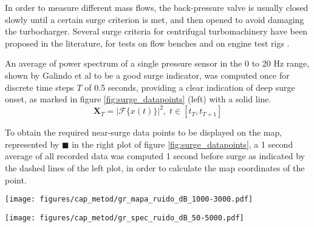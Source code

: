 In order to measure different mass flows, the back-pressure valve is usually closed slowly until a certain surge criterion is met, and then opened to avoid damaging the turbocharger. Several surge criteria for centrifugal turbomachinery have been proposed in the literature, for tests on flow benches \cite{galindo2006surge} and on engine test rigs \cite{galindo2013engine}.

An average of power spectrum of a single pressure sensor in the 0 to 20 Hz range, shown by Galindo et al \cite{galindo2006surge} to be a good surge indicator, was computed once for discrete time steps $T$ of 0.5 seconds, providing a clear indication of deep surge onset, as marked in figure \ref{fig:surge_datapoints} (left) with a solid line.
\begin{equation}
 \mathbf X_T=\left|\mathcal F\{x(t)\}\right|^2,\; t\in[t_T,t_{T+1}]
\end{equation}

To obtain the required near-surge data points to be displayed on the map, represented by $\blacksquare$ in the right plot of figure \ref{fig:surge_datapoints}, a 1 second average of all recorded data was computed 1 second before surge as indicated by the dashed lines of the left plot, in order to calculate the map coordinates of the point.

\begin{figure*}[t!]
\centering
\texttt{[image: figures/cap\_metod/gr\_mapa\_ruido\_dB\_1000-3000.pdf]}
\caption{Sample of noise level in the 1 -- 3 kHz band obtained through the processing described in subsection \ref{sub:noise_maps_and_spectrograms}, including the measured data points $(\circ)$ and the paths later expanded as spectrograms shown in figure \ref{fig:spec50-5k}. The left hand side map represents the inlet duct, whereas the right hand side map represents the outlet duct. }
\label{fig:map1k-3k}
\end{figure*}

\begin{figure*}[t!]
\centering
\texttt{[image: figures/cap\_metod/gr\_spec\_ruido\_dB\_50-5000.pdf]}
\caption{Sample of spectrograms calculated using the procedure outlined in subsection \ref{sub:noise_maps_and_spectrograms}, following the 160 krpm paths marked in figure \ref{fig:map1k-3k}. The 1--3 kHz band selected for the maps in figure \ref{fig:map1k-3k} is highlighted, along with some particular flow phenomena discussed in section \ref{sec:results_and_discussion}.}
\label{fig:spec50-5k}
\end{figure*}

